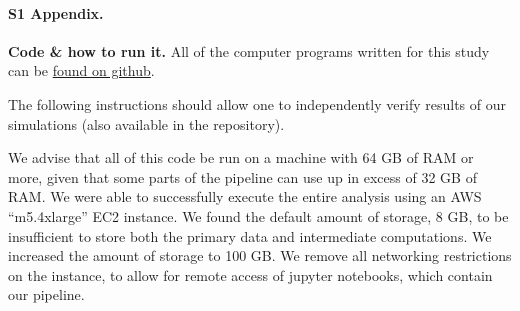 \documentclass[10pt,letterpaper]{article}
\begin{document}




\paragraph*{S1 Appendix.}
\label{AppendixA}
{\bf Code \& how to run it.} All of the computer programs written for this study can be \hyperlink{https://github.com/picrin/clinical_applications}{found on github}.

The following instructions should allow one to independently verify results of our simulations (also available in the repository).

We advise that all of this code be run on a machine with 64 GB of RAM or more, given that some parts of the pipeline can use up in excess of 32 GB of RAM. We were able to successfully execute the entire analysis using an AWS ``m5.4xlarge'' EC2 instance. We found the default amount of storage, 8 GB, to be insufficient to store both the primary data and intermediate computations. We increased the amount of storage to 100 GB. We remove all networking restrictions on the instance, to allow for remote access of jupyter notebooks, which contain our pipeline.
\end{document}
